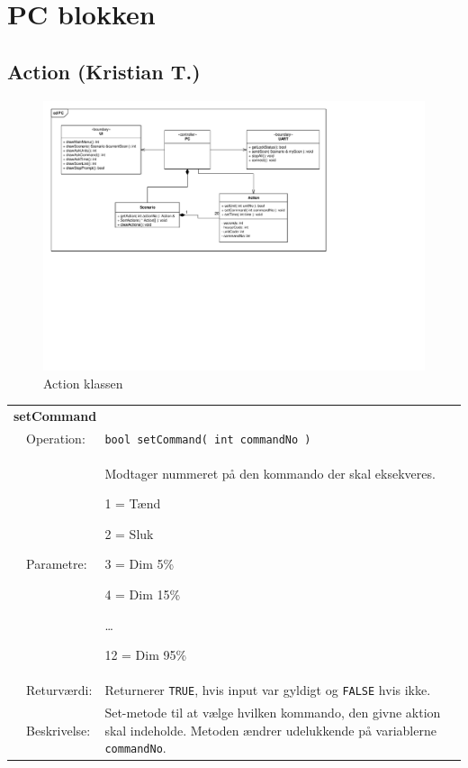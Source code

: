 \section{PC blokken}

\subsection{Action (Kristian T.)}

\begin{figure}[h]
\centering
\includegraphics[scale=1,clip=true, trim=389 282 302 204.7]{Systemarkitektur/diagrammer/PC_KlasseDiagram} %
\caption{Action klassen}
\end{figure}

\begin{table}[h] 
\begin{tabularx}{\textwidth}{p{0.6 cm} l X} %
\multicolumn{3}{l}{\textbf{setCommand}}\\
& Operation: & %
\texttt{bool setCommand( int commandNo )}
\\ & Parametre: & %
Modtager nummeret på den kommando der skal eksekveres.

1 = Tænd

2 = Sluk

3 = Dim 5\%

4 = Dim 15\%

\ldots 

12 = Dim 95\%

\\ & Returværdi: & %
Returnerer \texttt{TRUE}, hvis input var gyldigt og \texttt{FALSE} hvis ikke.
\\ & Beskrivelse: & %
Set-metode til at vælge hvilken kommando, den givne aktion skal indeholde. Metoden ændrer udelukkende på variablerne \texttt{commandNo}.
\\ \end{tabularx}
\end{table}

